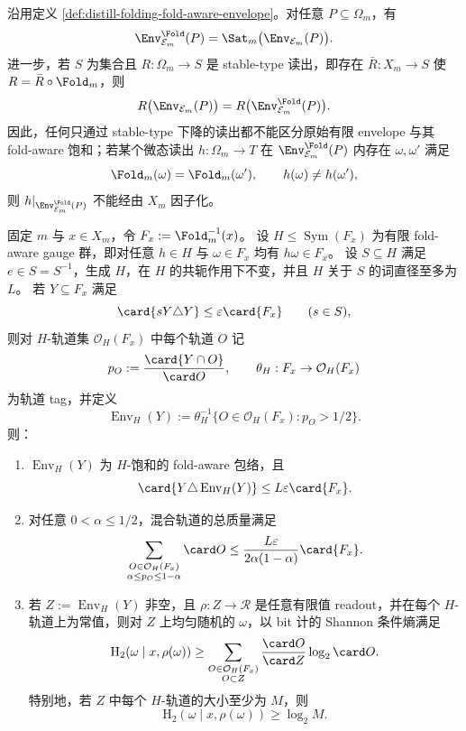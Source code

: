 \begin{proposition}\label{prop:distill-folding-fold-aware-envelope-saturation}
沿用定义 \ref{def:distill-folding-fold-aware-envelope}。对任意 \(P\subseteq\Omega_m\)，有
\[
\Env^{\Fold}_{\mathcal E_m}(P)=\Sat_m\bigl(\Env_{\mathcal E_m}(P)\bigr).
\]
进一步，若 \(S\) 为集合且 \(R:\Omega_m\to S\) 是 stable-type 读出，即存在
\(\bar R:X_m\to S\) 使 \(R=\bar R\circ\Fold_m\)，则
\[
R\bigl(\Env_{\mathcal E_m}(P)\bigr)
=R\bigl(\Env^{\Fold}_{\mathcal E_m}(P)\bigr).
\]
因此，任何只通过 stable-type 下降的读出都不能区分原始有限 envelope 与其 fold-aware 饱和；若某个微态读出
\(h:\Omega_m\to T\) 在 \(\Env^{\Fold}_{\mathcal E_m}(P)\) 内存在
\(\omega,\omega'\) 满足
\[
\Fold_m(\omega)=\Fold_m(\omega'),\qquad h(\omega)\ne h(\omega'),
\]
则 \(h|_{\Env^{\Fold}_{\mathcal E_m}(P)}\) 不能经由 \(X_m\) 因子化。
\end{proposition}
\begin{theorem}\label{distill:hrushovski_zilber_zariski_geometries_and_elekes_szabo_group_extraction-definable_envelope_and_stabilizer_theorem_schema-fold-aware-fiber-envelope-ledger}
固定 \(m\) 与 \(x\in X_m\)，令 \(F_x:=\Fold_m^{-1}(x)\)。
设 \(H\le\operatorname{Sym}(F_x)\) 为有限 fold-aware gauge 群，即对任意 \(h\in H\) 与 \(\omega\in F_x\) 均有 \(h\omega\in F_x\)。
设 \(S\subseteq H\) 满足 \(e\in S=S^{-1}\)，生成 \(H\)，在 \(H\) 的共轭作用下不变，并且 \(H\) 关于 \(S\) 的词直径至多为 \(L\)。
若 \(Y\subseteq F_x\) 满足
\[
\card{sY\triangle Y}\le \varepsilon\card{F_x}\qquad(s\in S),
\]
则对 \(H\)-轨道集 \(\mathcal O_H(F_x)\) 中每个轨道 \(O\) 记
\[
p_O:=\frac{\card{Y\cap O}}{\card O},
\qquad
\theta_H:F_x\to\mathcal O_H(F_x)
\]
为轨道 tag，并定义
\[
\operatorname{Env}_H(Y):=\theta_H^{-1}\{O\in\mathcal O_H(F_x):p_O>1/2\}.
\]
则：
\begin{enumerate}
  \item \(\operatorname{Env}_H(Y)\) 为 \(H\)-饱和的 fold-aware 包络，且
  \[
  \card{Y\triangle\operatorname{Env}_H(Y)}
  \le L\varepsilon\card{F_x}.
  \]
  \item 对任意 \(0<\alpha\le1/2\)，混合轨道的总质量满足
  \[
  \sum_{\substack{O\in\mathcal O_H(F_x)\\ \alpha\le p_O\le1-\alpha}}\card O
  \le
  \frac{L\varepsilon}{2\alpha(1-\alpha)}\card{F_x}.
  \]
  \item 若 \(Z:=\operatorname{Env}_H(Y)\) 非空，且 \(\rho:Z\to\mathcal R\) 是任意有限值 readout，并在每个 \(H\)-轨道上为常值，则对 \(Z\) 上均匀随机的 \(\omega\)，以 bit 计的 Shannon 条件熵满足
  \[
  \mathrm H_2(\omega\mid x,\rho(\omega))
  \ge
  \sum_{\substack{O\in\mathcal O_H(F_x)\\ O\subset Z}}
  \frac{\card O}{\card Z}\log_2\card O.
  \]
  特别地，若 \(Z\) 中每个 \(H\)-轨道的大小至少为 \(M\)，则
  \[
  \mathrm H_2(\omega\mid x,\rho(\omega))\ge\log_2 M.
  \]
\end{enumerate}
\end{theorem}
